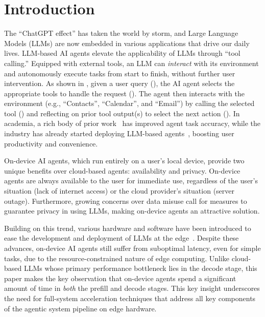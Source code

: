 \section{Introduction} \label{sect:introduction}

The ``ChatGPT effect'' has taken the world by storm, and Large Language Models (LLMs) are now embedded in various applications that drive our daily lives. 
LLM-based AI agents elevate the applicability of LLMs through ``tool calling.'' Equipped with external tools, an LLM can \textit{interact} with its environment and autonomously execute tasks from start to finish, without further user intervention. As shown in , given a user query (), the AI agent selects the appropriate tools to handle the request (). The agent then interacts with the environment (e.g., ``Contacts'', ``Calendar'', and ``Email'') by calling the selected tool () and reflecting on prior tool output(s) to select the next action (). In academia, a rich body of prior work~\cite{react,reflexion,llmcompiler,lats} has improved agent task accuracy, while the industry has already started deploying LLM-based agents~\cite{deep_research,anthropic_agent,gemini_cli,chatgpt_agent,manus}, boosting user productivity and convenience.

On-device AI agents, which run entirely on a user’s local device, provide two unique benefits over cloud-based agents: availability and privacy. On-device agents are always available to the user for immediate use, regardless of the user's situation (lack of internet access) or the cloud provider's situation (server outage). Furthermore, growing concerns over data misuse call for measures to guarantee privacy in using LLMs, making on-device agents an attractive solution.

Building on this trend, various hardware and software have been introduced to ease the development and deployment of LLMs at the edge~\cite{copilot_pc,qualcomm_snapdragon_x_elite,amd_ryzen_ai_max,apple_m4_pro_max,qualcomm_snapdragon_hexagon_sdk,apple_foundation_models_framework}. Despite these advances, on-device AI agents still suffer from suboptimal latency, even for simple tasks, due to the resource-constrained nature of edge computing. Unlike cloud-based LLMs whose primary performance bottleneck lies in the decode stage, this paper makes the key observation that on-device agents spend a significant amount of time in \emph{both} the prefill and decode stages.  This key insight underscores the need for full-system acceleration techniques that address all key components of the agentic system pipeline on edge hardware.


